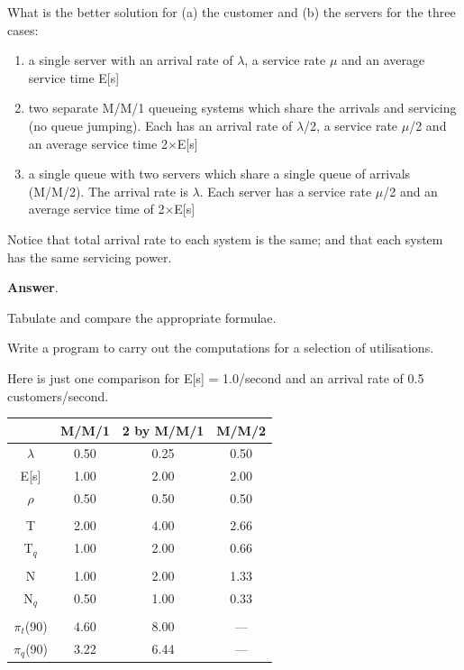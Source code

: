 \documentclass[12pt,fleqn]{report}
\begin{document}
What is the better solution for (a) the customer
and (b) the servers for the three cases:

\begin{enumerate}
\item  a single server with an arrival rate of $\lambda$,
a service rate $\mu$ and an average service time E[s]

\item  two separate M/M/1 queueing systems 
which share the arrivals and servicing (no queue jumping).
Each has  an arrival rate of $\lambda$/2,
a service rate $\mu$/2 and an average service time 2$\times$E[s]

\item a single queue with two servers which share a single queue of
arrivals (M/M/2).
The arrival rate is $\lambda$.
Each server has a service rate $\mu$/2 and an average service 
time of 2$\times$E[s]

\end{enumerate}

Notice that total arrival  rate to each system is the same;
and that each system has the same servicing power.

\noindent
{\bf Answer}.

Tabulate and compare the appropriate formulae.

Write a program to carry out the computations for
a selection of utilisations.

Here is just one comparison for E[s] = 1.0/second and 
an arrival rate of 0.5 customers/second.


\begin{center}
\begin{tabular}{|| c | c c c ||}
\hline
              & M/M/1      & 2 by M/M/1   & M/M/2   \\
\hline
$\lambda$     &  0.50       & 0.25         & 0.50   \\
E[s]          &  1.00       & 2.00         & 2.00   \\ 
$\rho$        &  0.50       & 0.50         & 0.50   \\
              &             &              &        \\
T             &  2.00       & 4.00         & 2.66   \\
T$_q$         &  1.00       & 2.00         & 0.66   \\
              &             &              &        \\
N             &  1.00       & 2.00         & 1.33   \\
N$_q$         &  0.50       & 1.00         & 0.33    \\
&&&\\
$\pi_t$(90)   &  4.60       & 8.00         & ---    \\
$\pi_q$(90)   &  3.22       & 6.44         & ---    \\
\hline
\end{tabular}
\end{center}
\end{document}
